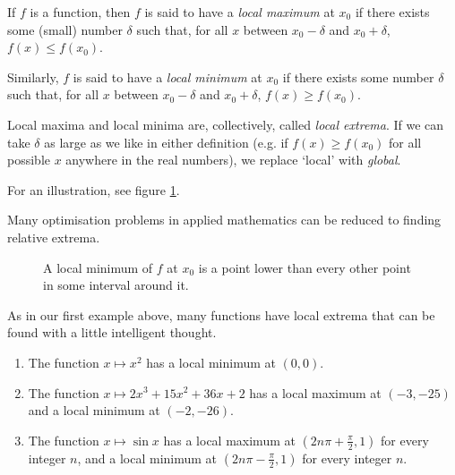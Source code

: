 \begin{defn}
  If $ f $ is a function, then $ f $ is said to have a \emph{local maximum} at $ x_0 $ if there exists some (small)
  number $ \delta $ such that, for all $ x $ between $ x_0 - \delta $ and $ x_0 + \delta $, $ f(x) \leq f(x_0) $.

  Similarly, $ f $ is said to have a \emph{local minimum} at $ x_0 $ if there exists some number $ \delta $ such that,
  for all $ x $ between $ x_0 - \delta $ and $ x_0 + \delta $, $ f(x) \geq f(x_0) $.

  Local maxima and local minima are, collectively, called \emph{local extrema}. If we can take $ \delta $ as large
  as we like in either definition (e.g. if $ f(x) \geq f(x_0) $ for all possible $ x $ anywhere in the real numbers),
  we replace `local' with \emph{global}.

  For an illustration, see figure \ref{fig:localmin}.
\end{defn}

Many optimisation problems in applied mathematics can be reduced to finding relative extrema.

\begin{figure}
  \centering
  \caption{A local minimum of $ f $ at $ x_0 $ is a point lower than every other point in some interval around it.\label{fig:localmin}}
\end{figure}

\begin{exs}\leavevmode
  As in our first example above, many functions have local extrema that can be found with a little intelligent thought.
  \begin{enumerate}
    \item The function $ x \mapsto x^2 $ has a local minimum at $ (0, 0) $.
    \item The function $ x \mapsto 2x^3 + 15x^2 + 36x + 2 $ has a local maximum at $ (-3, -25) $ and a local minimum at $ (-2, -26) $.
    \item The function $ x \mapsto \sin x $ has a local maximum at $ (2n\pi + \frac{\pi}{2}, 1) $ for every integer $ n $, and
          a local minimum at $ (2n\pi - \frac{\pi}{2}, 1) $ for every integer $ n $.
  \end{enumerate}
\end{exs}

